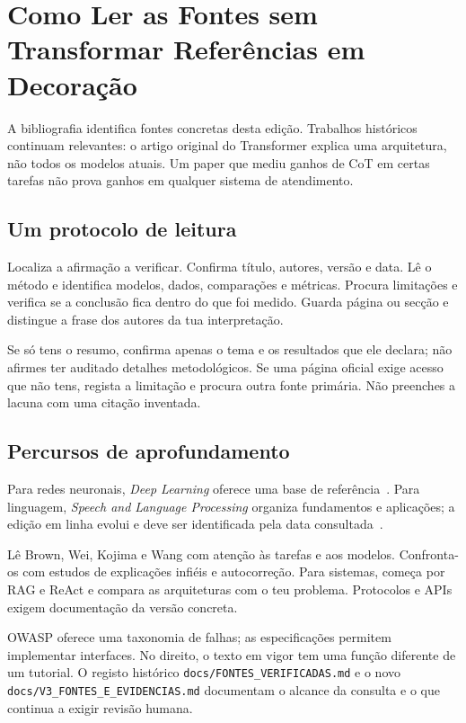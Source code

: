 \chapter{Como Ler as Fontes sem Transformar Referências em Decoração}
\label{ap:fontes}

A bibliografia identifica fontes concretas desta edição. Trabalhos históricos continuam relevantes: o artigo original do Transformer explica uma arquitetura, não todos os modelos atuais. Um paper que mediu ganhos de CoT em certas tarefas não prova ganhos em qualquer sistema de atendimento.

\section*{Um protocolo de leitura}
Localiza a afirmação a verificar. Confirma título, autores, versão e data. Lê o método e identifica modelos, dados, comparações e métricas. Procura limitações e verifica se a conclusão fica dentro do que foi medido. Guarda página ou secção e distingue a frase dos autores da tua interpretação.

Se só tens o resumo, confirma apenas o tema e os resultados que ele declara; não afirmes ter auditado detalhes metodológicos. Se uma página oficial exige acesso que não tens, regista a limitação e procura outra fonte primária. Não preenches a lacuna com uma citação inventada.

\section*{Percursos de aprofundamento}
Para redes neuronais, \emph{Deep Learning} oferece uma base de referência~\citep{goodfellow2016}. Para linguagem, \emph{Speech and Language Processing} organiza fundamentos e aplicações; a edição em linha evolui e deve ser identificada pela data consultada~\citep{jurafsky}.

Lê Brown, Wei, Kojima e Wang com atenção às tarefas e aos modelos. Confronta-os com estudos de explicações infiéis e autocorreção. Para sistemas, começa por RAG e ReAct e compara as arquiteturas com o teu problema. Protocolos e APIs exigem documentação da versão concreta.

OWASP oferece uma taxonomia de falhas; as especificações permitem implementar interfaces. No direito, o texto em vigor tem uma função diferente de um tutorial. O registo histórico \texttt{docs/FONTES\_VERIFICADAS.md} e o novo \texttt{docs/V3\_FONTES\_E\_EVIDENCIAS.md} documentam o alcance da consulta e o que continua a exigir revisão humana.
